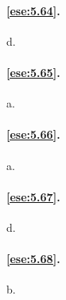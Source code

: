 \paragraph{\ref{ese:5.64}.}
d.

\paragraph{\ref{ese:5.65}.}
a.

\paragraph{\ref{ese:5.66}.}
a.

\paragraph{\ref{ese:5.67}.}
d.

\paragraph{\ref{ese:5.68}.}
b.

\endgroup
